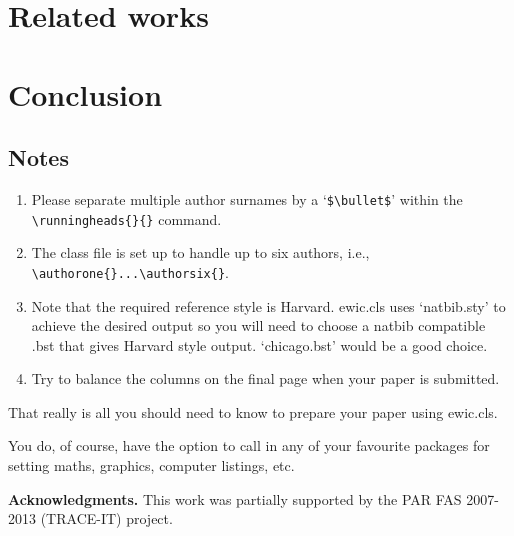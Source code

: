 \documentclass{ewic}
\begin{document}
\section{Related works}
%
\section{Conclusion}
%



\pagebreak
\subsection{Notes}
\begin{enumerate}
\item Please separate multiple author surnames by a `\verb+$\bullet$+' within the
\verb+\runningheads{}{}+ command.

\item The class file is set up to handle up to six authors, i.e., \verb+\authorone{}...\authorsix{}+.

\item Note that the required reference style is Harvard. ewic.cls
uses `natbib.sty' to achieve the desired output so you will need
to choose a natbib compatible .bst that gives Harvard style
output. `chicago.bst' would be a good choice.

\item Try to balance the columns on the final page when your paper is submitted.
\end{enumerate}

That really is all you should need to know to prepare your paper
using ewic.cls.\citep{Mills2003}

You do, of course, have the option to call in any of your
favourite packages for setting maths, graphics, computer listings,
etc.

\textbf{Acknowledgments. }
This work was partially supported by the PAR FAS 2007-2013 (TRACE-IT) project.

%
%
%
%



\end{document}
